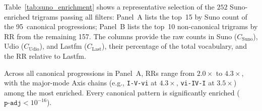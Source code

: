 \documentclass{article}
\begin{document}
Table~\ref{tab:suno_enrichment} shows a representative selection of the $252$ Suno-enriched trigrams passing all filters: Panel~A lists the top~15 by Suno count of the 95~canonical progressions; %
Panel~B lists the top~10 non-canonical trigrams by RR from the remaining 157. The columns provide the raw counts in Suno ($C_\text{Suno}$), Udio ($C_\text{Udio}$), and Lastfm ($C_\text{Last}$), their percentage of the total vocabulary, and the RR relative to Lastfm.

Across all canonical progressions in Panel~A, RRs range from $2.0\times$ to $4.3\times$, with the major-mode Axis chains (e.g., \texttt{I-V-vi} at $4.3\times$, \texttt{vi-IV-I} at $3.5\times$) among the most enriched. Every canonical pattern is significantly enriched ($\texttt{p-adj} < 10^{-16}$).
\end{document}
